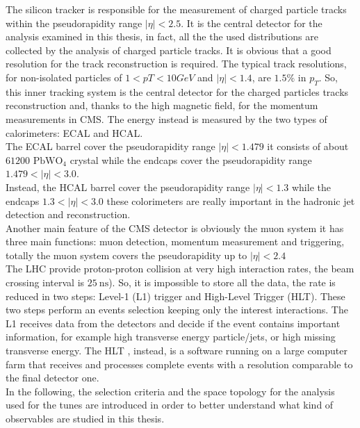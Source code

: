 \noindent The silicon tracker is responsible for the measurement of charged particle tracks within the pseudorapidity
range $|\eta| < 2.5$. It is the central detector for the analysis examined in this thesis, in fact, all the the used distributions are collected by the analysis of charged particle tracks. It is obvious that a good resolution for the track reconstruction is required. The typical track resolutions, for non-isolated particles of $1 < pT < 10 GeV$ and $|\eta| < 1.4$, are $1.5\%$ in $p_T$. So, this inner tracking system is the central detector for the charged particles tracks reconstruction and, thanks to the high magnetic field, for the momentum measurements in CMS. The energy instead is measured by the two types of calorimeters: ECAL and HCAL.
\\   
The ECAL barrel cover the pseudorapidity range $|\eta|<1.479$ it consists of about $61200$ $\mathrm{PbWO}_4$ crystal while the endcaps cover the pseudorapidity range $1.479<|\eta|<3.0$. 
\\
Instead, the HCAL barrel cover the pseudorapidity range $|\eta|<1.3$ while the endcaps $1.3<|\eta|<3.0$ these colorimeters are really important in the hadronic jet detection and reconstruction. 
\\
Another main feature of the CMS detector is obviously the muon system it has three main functions: muon detection, momentum measurement and triggering, totally the muon system covers the pseudorapidity up to $|\eta|<2.4$
\\
The LHC provide proton-proton collision at very high interaction rates, the beam crossing interval is $25\ \mathrm{ns}$). So, it is impossible to store all the data, the rate is reduced in two steps: Level-1 (L1) trigger and High-Level Trigger (HLT).
These two steps perform an events selection keeping only the interest interactions.
The L1 receives data from the detectors and decide if the event contains important information, for example high transverse energy particle/jets, or high missing transverse energy.
The HLT , instead, is a software running on a large computer farm that receives and processes complete events with a resolution comparable to the final detector one.
\\
In the following, the selection criteria and the space topology for the analysis used for the tunes are introduced in order to better understand what kind of observables are studied in this thesis.

